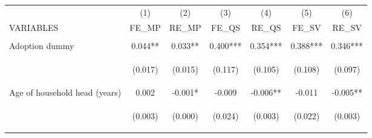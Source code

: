 \begin{center}
\begin{tabular}{lcccccc} \hline
 & (1) & (2) & (3) & (4) & (5) & (6) \\
VARIABLES & FE\_MP & RE\_MP & FE\_QS & RE\_QS & FE\_SV & RE\_SV \\ \hline
\vspace{4pt} & \begin{footnotesize}\end{footnotesize} & \begin{footnotesize}\end{footnotesize} & \begin{footnotesize}\end{footnotesize} & \begin{footnotesize}\end{footnotesize} & \begin{footnotesize}\end{footnotesize} & \begin{footnotesize}\end{footnotesize} \\
Adoption dummy & 0.044** & 0.033** & 0.400*** & 0.354*** & 0.388*** & 0.346*** \\
\vspace{4pt} & \begin{footnotesize}(0.017)\end{footnotesize} & \begin{footnotesize}(0.015)\end{footnotesize} & \begin{footnotesize}(0.117)\end{footnotesize} & \begin{footnotesize}(0.105)\end{footnotesize} & \begin{footnotesize}(0.108)\end{footnotesize} & \begin{footnotesize}(0.097)\end{footnotesize} \\
Age of household head (years) & 0.002 & -0.001* & -0.009 & -0.006** & -0.011 & -0.005** \\
\vspace{4pt} & \begin{footnotesize}(0.003)\end{footnotesize} & \begin{footnotesize}(0.000)\end{footnotesize} & \begin{footnotesize}(0.024)\end{footnotesize} & \begin{footnotesize}(0.003)\end{footnotesize} & \begin{footnotesize}(0.022)\end{footnotesize} & \begin{footnotesize}(0.003)\end{footnotesize} \\

\end{tabular}
\end{center}
